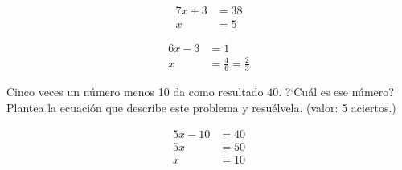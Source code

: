 \documentclass[11pt]{article}
\begin{document}
\vspace{-8mm}
\begin{multicols}{2}

\begin{align*}
7x + 3 &= 38 \\
x &= 5
\end{align*}

\begin{align*}
6x - 3 &= 1 \\
x &= \frac{4}{6} = \frac{2}{3}
\end{align*}

\end{multicols}

\vspace{2cm}
Cinco veces un n\'umero menos 10 da como resultado 40. ?`Cu\'al es ese n\'umero?
Plantea la ecuaci\'on que describe este problema y resu\'elvela. \hfill(valor: 5
aciertos.)

\begin{align*}
5x - 10 &= 40 \\
5x &= 50 \\
x &= 10
\end{align*}

\end{document}
